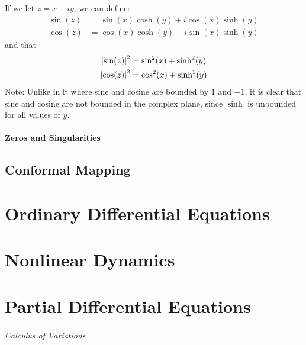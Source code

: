 \documentclass[12pt, english]{book}
\begin{document}
	If we let \(z = x + iy\), we can define:
	\begin{align*}
		\sin(z) &= \sin(x) \cosh(y) + i\cos(x) \sinh(y) \\
		\cos(z) &= \cos(x) \cosh(y) - i\sin(x) \sinh(y)
	\end{align*}
	and that 
	\begin{align*}
		\abs{\sin(z)}^2 &= \sin[2](x) + \sinh[2](y)\\
		\abs{\cos(z)}^2 &= \cos[2](x) + \sinh[2](y)
	\end{align*}
	Note: Unlike in \(\mathbb{R}\) where sine and cosine are bounded by \(1\) and \(-1\), 
	it is clear that sine and cosine are not bounded in the complex plane, since \(\sinh\) is unbounded for all values of \(y\). 
	
	\subsection{Zeros and Singularities} \label{Zeros and Singularities (Trig) Subsection - Complex}
	
	

	
	
	
	
	
	
	
	
	\chapter{Conformal Mapping} \label{Conformal Mapping Chapter - Complex}
	
	
	
	
	\part{Ordinary Differential Equations} \label{Ordinary Differential Equations Part}
	
	\part{Nonlinear Dynamics} \label{Nonlinear Dynamics Part}
	
	
	\part{Partial Differential Equations} \label{Partial Differential Equations Part}
	
	\paragraph{Calculus of Variations} \label{Calculus of Variations Part}
	
\end{document}
